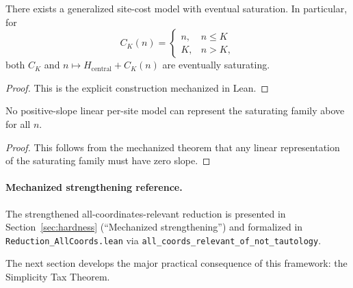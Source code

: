 \begin{theorem}\label{thm:generalized-saturation-possible}
There exists a generalized site-cost model with eventual saturation. In particular, for
\[
C_K(n)=\begin{cases}
n, & n\le K\\
K, & n>K,
\end{cases}
\]
both $C_K$ and $n\mapsto H_{\text{central}}+C_K(n)$ are eventually saturating.
\end{theorem}

\begin{proof}
This is the explicit construction mechanized in Lean.
\end{proof}

\begin{corollary}\label{cor:linear-positive-no-saturation}
No positive-slope linear per-site model can represent the saturating family above for all $n$.
\end{corollary}

\begin{proof}
This follows from the mechanized theorem that any linear representation of the saturating family must have zero slope.
\end{proof}

\paragraph{Mechanized strengthening reference.}
The strengthened all-coordinates-relevant reduction is presented in Section~\ref{sec:hardness} (``Mechanized strengthening'') and formalized in \texttt{Reduction\_AllCoords.lean} via \texttt{all\_coords\_relevant\_of\_not\_tautology}.

The next section develops the major practical consequence of this framework: the Simplicity Tax Theorem.
